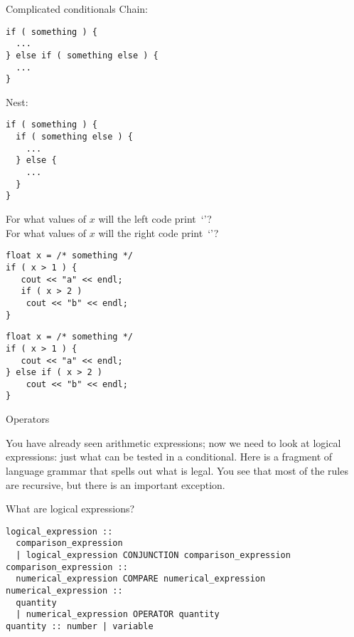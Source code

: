 \begin{slide}{Complicated conditionals}
  \label{sl:elseif}
  Chain:
\begin{verbatim}
if ( something ) {
  ...
} else if ( something else ) {
  ...
}
\end{verbatim}
Nest:
\begin{verbatim}
if ( something ) {
  if ( something else ) {
    ...
  } else {
    ...
  }
}
\end{verbatim}
\end{slide}

\begin{exercise}
  \label{ex:if-scope-ab}
  For what values of $x$ will the left code print~`'?\\
  For what values of $x$ will the right code print~`'?
  \begin{multicols}{2}
\begin{verbatim}
float x = /* something */
if ( x > 1 ) {
   cout << "a" << endl;
   if ( x > 2 )
    cout << "b" << endl;
}
\end{verbatim}
\columnbreak
\begin{verbatim}
float x = /* something */
if ( x > 1 ) {
   cout << "a" << endl;
} else if ( x > 2 )
    cout << "b" << endl;
}
\end{verbatim}
  \end{multicols}
\end{exercise}

 {Operators}

You have already seen arithmetic expressions; now we need to look at
logical expressions: just what can be tested in a conditional. 
Here is a fragment of language grammar that spells out what is
legal. You see that most of the rules are recursive, but there is an
important exception.

\begin{block}{What are logical expressions?}
  \label{sl:logical-syntax}
\begin{verbatim}
logical_expression :: 
  comparison_expression
  | logical_expression CONJUNCTION comparison_expression
comparison_expression :: 
  numerical_expression COMPARE numerical_expression
numerical_expression :: 
  quantity
  | numerical_expression OPERATOR quantity
quantity :: number | variable
\end{verbatim}
\end{block}

